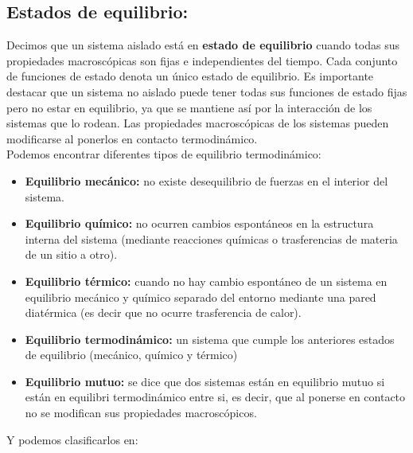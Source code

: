 \documentclass[12pt,a4paper]{article}
\begin{document}
\subsection{Estados de equilibrio:}
Decimos que un sistema aislado está en \textbf{estado de equilibrio} cuando todas sus propiedades macroscópicas son fijas e independientes del tiempo. Cada conjunto de funciones de estado denota un único estado de equilibrio. Es importante destacar que un sistema no aislado puede tener todas sus funciones de estado fijas pero no estar en equilibrio, ya que se mantiene así por la interacción de los sistemas que lo rodean. Las propiedades macroscópicas de los sistemas pueden modificarse al ponerlos en contacto termodinámico. \\

Podemos encontrar diferentes tipos de equilibrio termodinámico: 

\begin{itemize}

\item \textbf{Equilibrio mecánico:} no existe desequilibrio de fuerzas en el interior del sistema.

\item \textbf{Equilibrio químico:} no ocurren cambios espontáneos en la estructura interna del sistema (mediante reacciones químicas o trasferencias de materia de un sitio a otro).

\item \textbf{Equilibrio térmico:} cuando no hay cambio espontáneo de un sistema en equilibrio mecánico y químico separado del entorno mediante una pared diatérmica (es decir que no ocurre trasferencia de calor).

\item \textbf{Equilibrio termodinámico:} un sistema que cumple los anteriores estados de equilibrio (mecánico, químico y térmico)

\item \textbf{Equilibrio mutuo:} se dice que dos sistemas están en equilibrio mutuo si están en equilibri termodinámico entre si, es decir, que al ponerse en contacto no se modifican sus propiedades macroscópicos. 

\end{itemize}


Y podemos clasificarlos en:  
\end{document}
